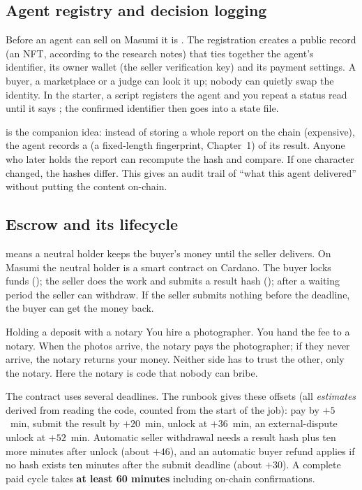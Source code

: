 \subsection{Agent registry and decision logging}
Before an agent can sell on Masumi it is . The registration creates a public record (an NFT, according to the research notes) that ties together the agent's identifier, its owner wallet (the seller verification key) and its payment settings. A buyer, a marketplace or a judge can look it up; nobody can quietly swap the identity. In the starter, a script registers the agent and you repeat a status read until it says ; the confirmed identifier then goes into a state file.

 is the companion idea: instead of storing a whole report on the chain (expensive), the agent records a  (a fixed-length fingerprint, Chapter~1) of its result. Anyone who later holds the report can recompute the hash and compare. If one character changed, the hashes differ. This gives an audit trail of ``what this agent delivered'' without putting the content on-chain.

\subsection{Escrow and its lifecycle}
 means a neutral holder keeps the buyer's money until the seller delivers. On Masumi the neutral holder is a smart contract on Cardano. The buyer locks funds (); the seller does the work and submits a result hash (); after a waiting period the seller can withdraw. If the seller submits nothing before the deadline, the buyer can get the money back.

\begin{analogybox}{Holding a deposit with a notary}
You hire a photographer. You hand the fee to a notary. When the photos arrive, the notary pays the photographer; if they never arrive, the notary returns your money. Neither side has to trust the other, only the notary. Here the notary is code that nobody can bribe.
\end{analogybox}

The contract uses several deadlines. The runbook gives these offsets (all \emph{estimates} derived from reading the code, counted from the start of the job): pay by $+5$~min, submit the result by $+20$~min, unlock at $+36$~min, an external-dispute unlock at $+52$~min. Automatic seller withdrawal needs a result hash plus ten more minutes after unlock (about $+46$), and an automatic buyer refund applies if no hash exists ten minutes after the submit deadline (about $+30$). A complete paid cycle takes \textbf{at least 60 minutes} including on-chain confirmations.

